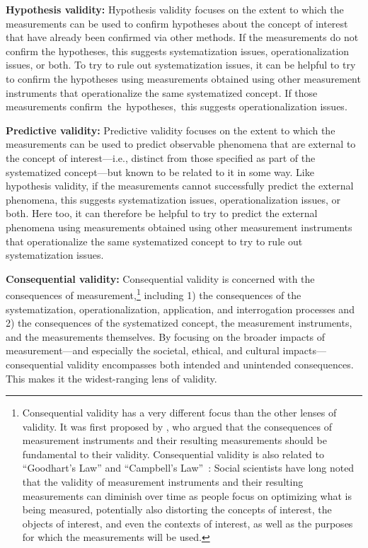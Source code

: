 \documentclass{article}
\begin{document}
\textbf{Hypothesis validity:} Hypothesis validity focuses on the extent to which the measurements can be used to confirm hypotheses about the concept of interest that have already been confirmed via other methods. If the measurements do not confirm the hypotheses, this suggests systematization issues,  operationalization issues, or both. To try to rule out systematization issues, it can be helpful to try to confirm the hypotheses using measurements obtained using other measurement instruments that operationalize the same systematized concept. If those measurements confirm~the~hypotheses,~this suggests operationalization issues.

\textbf{Predictive validity:} Predictive validity focuses on the extent to which the measurements can be used to predict observable phenomena that are external to the concept of interest---i.e., distinct from those specified as part of the systematized concept---but  known to be related to it in some way. Like hypothesis validity, if the measurements cannot successfully predict the external phenomena, this suggests systematization issues, operationalization issues, or both. Here too, it can therefore be helpful to try to predict the external phenomena using measurements obtained using other measurement instruments that operationalize the same systematized concept to try to rule out systematization issues.

\textbf{Consequential validity:} Consequential validity is concerned with the consequences of measurement,\footnote{Consequential validity has a very different focus than the other lenses of validity. It was first proposed by \citet{messick1987validity}, who argued that the consequences of measurement instruments and their resulting measurements should be fundamental to their validity. Consequential validity is also related to ``Goodhart's Law'' and ``Campbell's Law''~\citep{jacobs2021governance}: Social scientists have long noted that the validity of measurement instruments and their resulting measurements can diminish over time as people focus on optimizing what is being measured, potentially also distorting the concepts of interest, the objects of interest, and even the contexts of interest, as well as the purposes for which the measurements will be used.} including 1) the consequences of the systematization, operationalization, application, and interrogation processes and 2) the consequences of the systematized concept, the measurement instruments, and the measurements themselves. By focusing on the broader impacts of measurement---and especially the societal, ethical, and cultural impacts---consequential validity encompasses both intended and unintended consequences. This makes it the widest-ranging lens of validity. 
\end{document}

